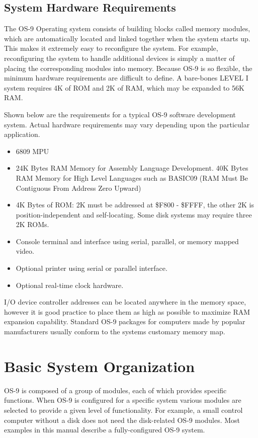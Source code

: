 \documentclass[
]{article}
\begin{document}
\subsection{System Hardware Requirements}

The OS-9 Operating system consists of building blocks called memory
modules, which are automatically located and linked together when the
system starts up. This makes it extremely easy to reconfigure the
system. For example, reconfiguring the system to handle additional
devices is simply a matter of placing the corresponding modules into
memory. Because OS-9 is so flexible, the minimum hardware requirements
are difficult to define. A bare-bones LEVEL I system requires 4K of ROM
and 2K of RAM, which may be expanded to 56K RAM.

Shown below are the requirements for a typical OS-9 software development
system. Actual hardware requirements may vary depending upon the
particular application.

\begin{itemize}
\item
  6809 MPU
\item
  24K Bytes RAM Memory for Assembly Language Development. 40K Bytes RAM
  Memory for High Level Languages such as BASIC09 (RAM Must Be
  Contiguous From Address Zero Upward)
\item
  4K Bytes of ROM: 2K must be addressed at \$F800 - \$FFFF, the other 2K
  is position-independent and self-locating. Some disk systems may
  require three 2K ROMs.
\item
  Console terminal and interface using serial, parallel, or memory
  mapped video.
\item
  Optional printer using serial or parallel interface.
\item
  Optional real-time clock hardware.
\end{itemize}

I/O device controller addresses can be located anywhere in the memory
space, however it is good practice to place them as high as possible to
maximize RAM expansion capability. Standard OS-9 packages for computers
made by popular manufacturers usually conform to the
system\textquotesingle s customary memory map.

\section{Basic System Organization}

OS-9 is composed of a group of modules, each of which provides specific
functions. When OS-9 is configured for a specific system various modules
are selected to provide a given level of functionality. For example, a
small control computer without a disk does not need the disk-related
OS-9 modules. Most examples in this manual describe a fully-configured
OS-9 system.
\end{document}
